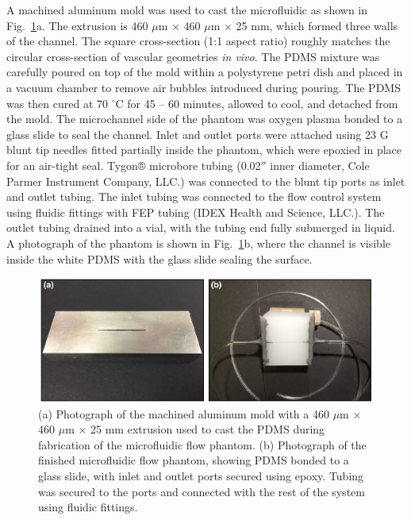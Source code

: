 \documentclass[12pt]{spieman}
\begin{document}
\begin{spacing}{2}
A machined aluminum mold was used to cast the microfluidic as shown in Fig.~\ref{fig:microfluidic}a. The extrusion is 460 $\mu$m $\times$ 460 $\mu$m $\times$ 25 mm, which formed three walls of the channel. The square cross-section (1:1 aspect ratio) roughly matches the circular cross-section of vascular geometries \textit{in vivo}. The PDMS  mixture was carefully poured on top of the mold within a polystyrene petri dish and placed in a vacuum chamber to remove air bubbles introduced during pouring. The PDMS was then cured at 70 $^\circ$C for 45 -- 60 minutes, allowed to cool, and detached from the mold. The microchannel side of the phantom was oxygen plasma bonded to a glass slide to seal the channel. Inlet and outlet ports were attached using 23 G blunt tip needles fitted partially inside the phantom, which were epoxied in place for an air-tight seal. Tygon® microbore tubing (0.02$''$ inner diameter, Cole Parmer Instrument Company, LLC.) was connected to the blunt tip ports as inlet and outlet tubing. The inlet tubing was connected to the flow control system using fluidic fittings with FEP tubing (IDEX Health and Science, LLC.). The outlet tubing drained into a vial, with the tubing end fully submerged in liquid. A photograph of the phantom is shown in Fig.~\ref{fig:microfluidic}b, where the channel is visible inside the white PDMS with the glass slide sealing the surface.

\begin{figure}
    \includegraphics[width=\textwidth]{Figure1.pdf}
    \caption {
        (a) Photograph of the machined aluminum mold with a 460 $\mu$m $\times$ 460 $\mu$m $\times$ 25 mm extrusion used to cast the PDMS during fabrication of the microfluidic flow phantom. (b) Photograph of the finished microfluidic flow phantom, showing PDMS bonded to a glass slide, with inlet and outlet ports secured using epoxy. Tubing was secured to the ports and connected with the rest of the system using fluidic fittings.
    }
    \label{fig:microfluidic}
\end{figure}


\end{spacing}
\end{document}
